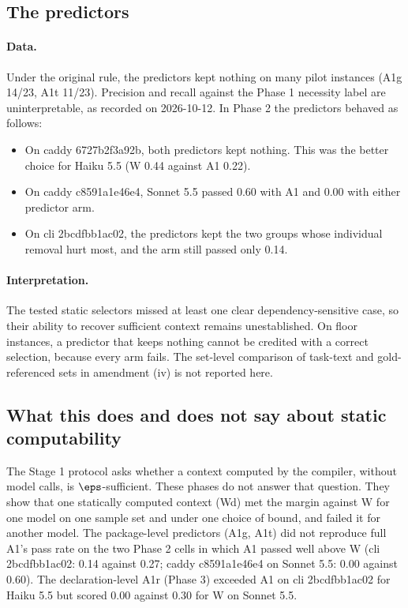 \subsection{The predictors}

\paragraph{Data.} Under the original rule, the predictors kept nothing on many pilot instances (A1g 14/23, A1t 11/23). Precision and recall against the Phase 1 necessity label are uninterpretable, as recorded on 2026-10-12. In Phase 2 the predictors behaved as follows:
\begin{itemize}
\item On caddy 6727b2f3a92b, both predictors kept nothing. This was the better choice for Haiku 5.5 (W 0.44 against A1 0.22).
\item On caddy c8591a1e46e4, Sonnet 5.5 passed 0.60 with A1 and 0.00 with either predictor arm.
\item On cli 2bcdfbb1ac02, the predictors kept the two groups whose individual removal hurt most, and the arm still passed only 0.14.
\end{itemize}

\paragraph{Interpretation.} The tested static selectors missed at least one clear dependency-sensitive case, so their ability to recover sufficient context remains unestablished. On floor instances, a predictor that keeps nothing cannot be credited with a correct selection, because every arm fails. The set-level comparison of task-text and gold-referenced sets in amendment (iv) is not reported here.

\subsection{What this does and does not say about static computability}

The Stage 1 protocol asks whether a context computed by the compiler, without model calls, is $\eps$-sufficient. These phases do not answer that question. They show that one statically computed context (Wd) met the margin against W for one model on one sample set and under one choice of bound, and failed it for another model. The package-level predictors (A1g, A1t) did not reproduce full A1's pass rate on the two Phase 2 cells in which A1 passed well above W (cli 2bcdfbb1ac02: 0.14 against 0.27; caddy c8591a1e46e4 on Sonnet 5.5: 0.00 against 0.60). The declaration-level A1r (Phase 3) exceeded A1 on cli 2bcdfbb1ac02 for Haiku 5.5 but scored 0.00 against 0.30 for W on Sonnet 5.5.

